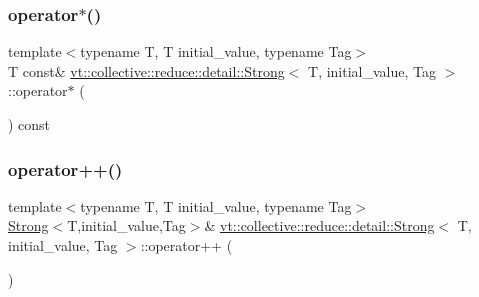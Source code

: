\subsubsection{\texorpdfstring{operator$\ast$()}{operator*()}\hspace{0.1cm}{\footnotesize\ttfamily [2/2]}}
{\footnotesize\ttfamily template$<$typename T, T initial\+\_\+value, typename Tag$>$ \\
T const\& \hyperlink{structvt_1_1collective_1_1reduce_1_1detail_1_1_strong}{vt\+::collective\+::reduce\+::detail\+::\+Strong}$<$ T, initial\+\_\+value, Tag $>$\+::operator$\ast$ (\begin{DoxyParamCaption}{ }\end{DoxyParamCaption}) const\hspace{0.3cm}{\ttfamily [inline]}}

\mbox{\label{structvt_1_1collective_1_1reduce_1_1detail_1_1_strong_a403ac1145637bfab0550181b5f7bdd5f}} 
\subsubsection{\texorpdfstring{operator++()}{operator++()}}
{\footnotesize\ttfamily template$<$typename T, T initial\+\_\+value, typename Tag$>$ \\
\hyperlink{structvt_1_1collective_1_1reduce_1_1detail_1_1_strong}{Strong}$<$T,initial\+\_\+value,Tag$>$\& \hyperlink{structvt_1_1collective_1_1reduce_1_1detail_1_1_strong}{vt\+::collective\+::reduce\+::detail\+::\+Strong}$<$ T, initial\+\_\+value, Tag $>$\+::operator++ (\begin{DoxyParamCaption}{ }\end{DoxyParamCaption})\hspace{0.3cm}{\ttfamily [inline]}}

\mbox{\label{structvt_1_1collective_1_1reduce_1_1detail_1_1_strong_ac8773530a7b4b1a3b5e54eb6f945c582}} 
